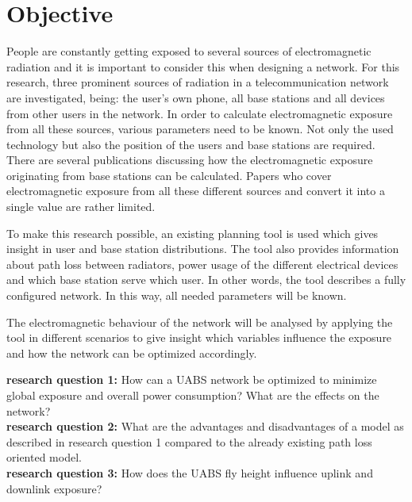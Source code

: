 \section{Objective}
\label{sec:objective}
People are constantly getting exposed to several sources of electromagnetic radiation and it is important to consider this when designing a network. For this research, three prominent sources of radiation in a telecommunication
network are investigated, being: the user's own phone, all base stations and all devices from other users in the network. In order to calculate electromagnetic 
exposure from all these sources, various parameters need to be known. Not only the used technology but also the position of the users and base stations 
are required. There are several publications discussing how the electromagnetic exposure originating from base stations can be calculated. 
Papers who cover electromagnetic exposure from all these different sources and convert it into a single value are rather limited.

To make this research possible, an existing planning tool is used which gives insight in user and base station distributions.
The tool also provides information about path loss between radiators, power usage of the different electrical devices and which base station serve which user. In other words, the tool describes 
a fully configured network.
In this way, all needed parameters will be known.

The electromagnetic behaviour of the network will be analysed by applying the tool in different scenarios to give insight which variables influence the exposure and how
the network can be optimized accordingly. 

\textbf{research question 1:} How can a \gls{UABS} network be optimized to minimize global exposure and overall power consumption? What are the effects on the network?\\

\textbf{research question 2:} What are the advantages and disadvantages of a model as described in research question 1 compared to the already existing path loss oriented model.\\

\textbf{research question 3:} How does the \gls{UABS} fly height influence uplink and downlink exposure?


